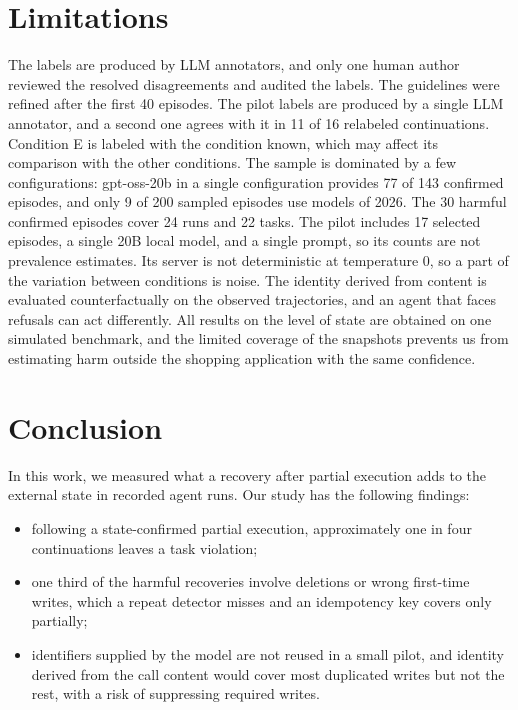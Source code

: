 \documentclass[conference]{IEEEtran}
\begin{document}
\section{Limitations}\label{sec:limitations}

The labels are produced by LLM annotators, and only one human author reviewed the resolved disagreements and audited the labels. The guidelines were refined after the first 40 episodes. The pilot labels are produced by a single LLM annotator, and a second one agrees with it in 11 of 16 relabeled continuations. Condition E is labeled with the condition known, which may affect its comparison with the other conditions. The sample is dominated by a few configurations: gpt-oss-20b in a single configuration provides 77 of 143 confirmed episodes, and only 9 of 200 sampled episodes use models of 2026. The 30 harmful confirmed episodes cover 24 runs and 22 tasks. The pilot includes 17 selected episodes, a single 20B local model, and a single prompt, so its counts are not prevalence estimates. Its server is not deterministic at temperature 0, so a part of the variation between conditions is noise. The identity derived from content is evaluated counterfactually on the observed trajectories, and an agent that faces refusals can act differently. All results on the level of state are obtained on one simulated benchmark, and the limited coverage of the snapshots prevents us from estimating harm outside the shopping application with the same confidence.

\section{Conclusion}\label{sec:conclusion}

In this work, we measured what a recovery after partial execution adds to the external state in recorded agent runs. Our study has the following findings:
\begin{itemize}
\item following a state-confirmed partial execution, approximately one in four continuations leaves a task violation;
\item one third of the harmful recoveries involve deletions or wrong first-time writes, which a repeat detector misses and an idempotency key covers only partially;
\item identifiers supplied by the model are not reused in a small pilot, and identity derived from the call content would cover most duplicated writes but not the rest, with a risk of suppressing required writes.
\end{itemize}



\end{document}
